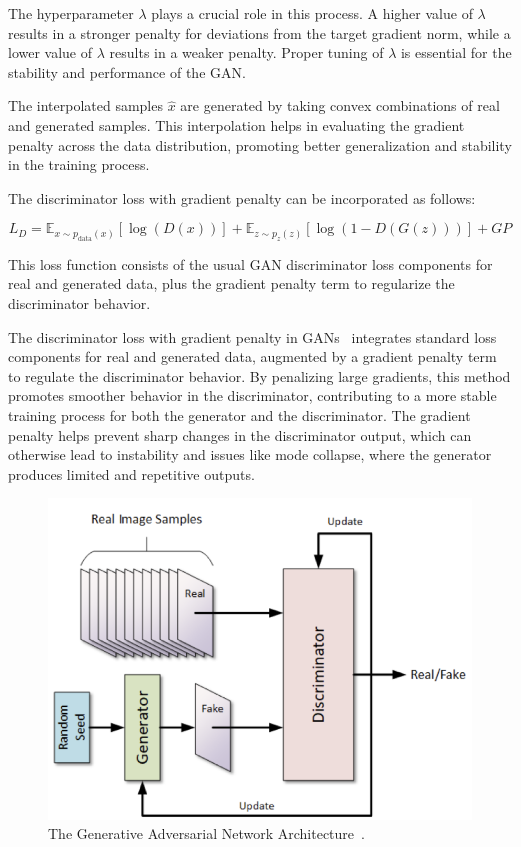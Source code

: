 \documentclass[12pt,a4paper]{report}
\begin{document}
The hyperparameter \(\lambda\) plays a crucial role in this process. A higher value of \(\lambda\) results in a stronger penalty for deviations from the target gradient norm, while a lower value of \(\lambda\) results in a weaker penalty. Proper tuning of \(\lambda\) is essential for the stability and performance of the GAN.

The interpolated samples \(\hat{x}\) are generated by taking convex combinations of real and generated samples. This interpolation helps in evaluating the gradient penalty across the data distribution, promoting better generalization and stability in the training process.

The discriminator loss with gradient penalty can be incorporated as follows:

\begin{equation}
  L_D = \mathbb{E}_{x \sim p_{\text{data}}(x)} \left[ \log(D(x)) \right] + \mathbb{E}_{z \sim p_z(z)} \left[ \log(1 - D(G(z))) \right] + GP
\end{equation}

This loss function consists of the usual GAN discriminator loss components for real and generated data, plus the gradient penalty term to regularize the discriminator behavior.


The discriminator loss with gradient penalty in GANs~\cite{goodfellow2014generative} integrates standard loss components for real and generated data, augmented by a gradient penalty term to regulate the discriminator behavior. By penalizing large gradients, this method promotes smoother behavior in the discriminator, contributing to a more stable training process for both the generator and the discriminator. The gradient penalty helps prevent sharp changes in the discriminator output, which can otherwise lead to instability and issues like mode collapse, where the generator produces limited and repetitive outputs.

\begin{figure}[th]
  \centering
  \includegraphics[scale=0.6]{./pics/gan.png}
  \caption[The Generative Adversarial Network Architecture]{The Generative Adversarial Network Architecture~\cite{gan-photo}.}
  \label{fig:pi6}
\end{figure}
\end{document}
